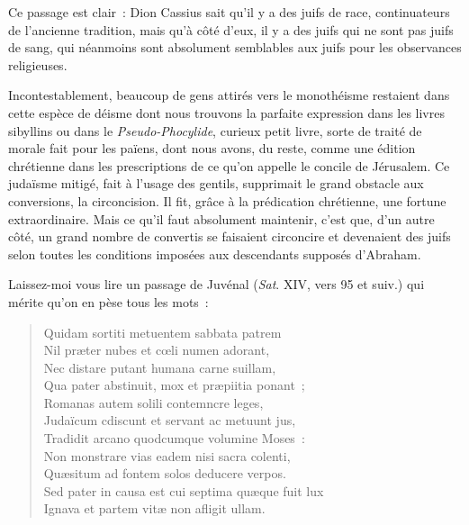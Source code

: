 \documentclass[french,twoside]{book} %
\newcommand\orgName[1]{#1}
\newcommand\persName[1]{#1}
\begin{document}
\noindent Ce passage est clair : {\persName Dion Cassius} sait qu’il y a des juifs de race, continuateurs de l’ancienne tradition, mais qu’à côté d’eux, il y a des juifs qui ne sont pas juifs de sang, qui néanmoins sont absolument semblables aux juifs pour les observances religieuses.\par
Incontestablement, beaucoup de gens attirés vers le monothéisme restaient dans cette espèce de déisme dont nous trouvons la parfaite expression dans les livres sibyllins ou dans le {\itshape Pseudo-Phocylide}, curieux petit livre, sorte de traité de morale fait pour les païens, dont nous avons, du reste, comme une édition chrétienne dans les prescriptions de ce qu’on appelle le {\orgName concile de Jérusalem}. Ce judaïsme mitigé, fait à l’usage des gentils, supprimait le grand obstacle aux conversions, la circoncision. Il fit, grâce à la prédication chrétienne, une fortune extraordinaire. Mais ce qu’il faut absolument maintenir, c’est que, d’un autre côté, un grand nombre de convertis se faisaient circoncire et devenaient des juifs selon toutes les conditions imposées aux descendants supposés d’{\persName Abraham}.\par
Laissez-moi vous lire un passage de {\persName Juvénal} (\emph{Sat}. XIV, vers 95 et suiv.) qui mérite qu’on en pèse tous les mots :\par


\begin{verse}
Quidam sortiti metuentem sabbata patrem\\
Nil præter nubes et cœli numen adorant,\\
Nec distare putant humana carne suillam,\\
Qua pater abstinuit, mox et præpiitia ponant ;\\
Romanas autem solili contemncre leges,\\
Judaïcum cdiscunt et servant ac metuunt jus,\\
Tradidit arcano quodcumque volumine Moses :\\
Non monstrare vias eadem nisi sacra colenti,\\
Quæsitum ad fontem solos deducere verpos.\\
Sed pater in causa est cui septima quæque fuit lux\\
Ignava et partem vitæ non afligit ullam.\\
\end{verse}
\end{document}
